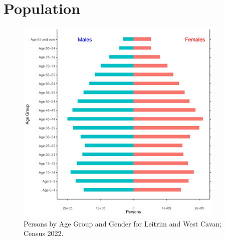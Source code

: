\documentclass{article}
\begin{document}
\pagebreak

\section{Population} 
\label{sect:Pop}

\begin{figure}[h]
	\centering
	\includegraphics[width = 100mm]{../figures/PyramidPlot.pdf}
	\caption{Persons by Age Group and Gender for Leitrim and West Cavan; Census 2022.}
	\label{fig:2ae19629-1a6a-13a3-e055-000000000001}
	\end{figure}
\end{document}
